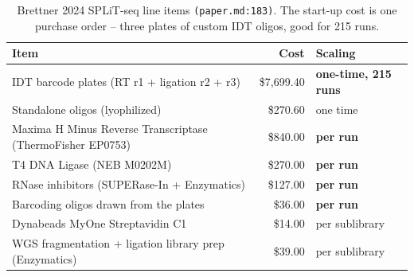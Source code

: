 \begin{table}[htbp]\centering
\footnotesize
\caption[]{Brettner 2024 SPLiT-seq line items \texttt{(paper.md:183)}. The start-up cost is one purchase order -- three plates of custom IDT oligos, good for 215 runs.}\label{tab:brettner-items}
\begin{tabular}{lrl}
\toprule
Item & Cost & Scaling \\
\midrule
IDT barcode plates (RT r1 + ligation r2 + r3) & \$7{,}699.40 & \textbf{one-time{,} 215 runs} \\
Standalone oligos (lyophilized) & \$270.60 & one time \\
Maxima H Minus Reverse Transcriptase (ThermoFisher EP0753) & \$840.00 & \textbf{per run} \\
T4 DNA Ligase (NEB M0202M) & \$270.00 & \textbf{per run} \\
RNase inhibitors (SUPERase-In + Enzymatics) & \$127.00 & \textbf{per run} \\
Barcoding oligos drawn from the plates & \$36.00 & \textbf{per run} \\
Dynabeads MyOne Streptavidin C1 & \$14.00 & per sublibrary \\
WGS fragmentation + ligation library prep (Enzymatics) & \$39.00 & per sublibrary \\
\bottomrule
\end{tabular}
\end{table}
